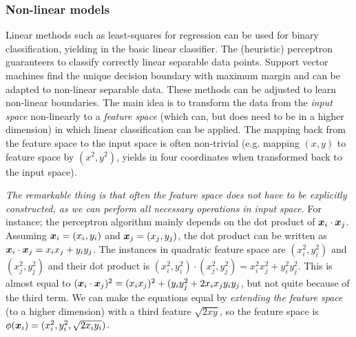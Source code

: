 \subsubsection{Non-linear models}\label{non-linear}
Linear methods such as least-squares for regression can be used for binary classification, yielding in the basic linear classifier.
The (heuristic) perceptron guaranteers to classify correctly linear separable data points.
Support vector machines find the unique decision boundary with maximum margin and can be adapted to non-linear separable data.
These methods can be adjusted to learn non-linear boundaries.
The main idea is to transform the data from the \emph{input space} non-linearly to a \emph{feature space} (which can, but does need to be in a higher dimension) in which linear classification can be applied.
The mapping back from the feature space to the input space is often non-trivial (e.g. mapping $(x,y)$ to feature space by $(x^2, y^2)$, yields in four coordinates when transformed back to the input space).

\emph{The remarkable thing is that often the feature space does not have to be explicitly constructed, as we can perform all necessary operations in input space.}
For instance; the perceptron algorithm mainly depends on the dot product of $\vectorsym{x}_i \cdot \vectorsym{x}_j$.
Assuming $\vectorsym{x}_i = (x_i, y_i)$ and $\vectorsym{x}_j = (x_j, y_j)$, the dot product can be written as $\vectorsym{x}_i \cdot \vectorsym{x}_j = x_i x_j + y_i y_j$.
The instances in quadratic feature space are $(x_i^2, y_i^2)$ and $(x_j^2, y_j^2)$ and their dot product is $(x_i^2, y_i^2) \cdot (x_j^2, y_j^2) = x_i^2 x_j^2 + y_i^2 y_j^2$.
This is almost equal to $(\vectorsym{x}_i \cdot \vectorsym{x}_j)^2 = (x_i x_j)^2 + (y_i y_j^2 + 2 x_i x_j y_i y_j$, but not quite because of the third term.
We can make the equations equal by \emph{extending the feature space} (to a higher dimension) with a third feature $\sqrt{2xy}$, so the feature space is $\phi(\vectorsym{x}_i) = (x_i^2, y_i^2, \sqrt{2x_i y_i})$.

